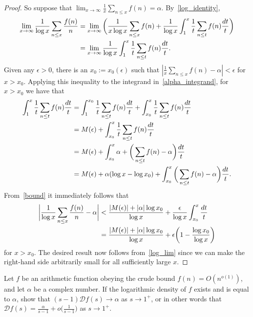 \documentclass[11pt]{article}
\newenvironment{ex}[1]
  {\renewcommand\theinnercustomthm{#1}\innercustomthm}
  {\endinnercustomthm}
\begin{document}
\begin{proof}
So suppose that $\lim_{x\to\infty}\frac{1}{x}\sum_{n\leq x}f(n) = \alpha$. By~\eqref{log_identity},
\begin{align}
\lim_{x\to\infty}\frac{1}{\log{x}}\sum_{n\leq x}\frac{f(n)}{n} &= \lim_{x\to\infty}\bigg(\frac{1}{x\log{x}}\sum_{n\leq x}f(n)+\frac{1}{\log{x}}\int_1^x\frac{1}{t}\sum_{n\leq t}f(n)\frac{dt}{t}\bigg)\notag\\
&= \lim_{x\to\infty}\frac{1}{\log{x}}\int_1^x\frac{1}{t}\sum_{n\leq t}f(n)\frac{dt}{t}.\label{alpha_integrand}
\end{align}
Given any $\epsilon >0$, there is an $x_0:=x_0(\epsilon)$ such that $|\frac{1}{x}\sum_{n\leq x}f(n)-\alpha|<\epsilon$ for $x>x_0$. Applying this inequality to the integrand in~\eqref{alpha_integrand}, for $x>x_0$ we have that
\begin{align}
\int_1^x\frac{1}{t}\sum_{n\leq t}f(n)\frac{dt}{t} &= \int_1^{x_0}\frac{1}{t}\sum_{n\leq t}f(n)\frac{dt}{t}+\int_{x_0}^x\frac{1}{t}\sum_{n\leq t}f(n)\frac{dt}{t}\notag\\
&= M(\epsilon)+\int_{x_0}^x\frac{1}{t}\sum_{n\leq t}f(n)\frac{dt}{t}\notag\\
&= M(\epsilon)+\int_{x_0}^x\alpha+\bigg(\sum_{n\leq t}f(n)-\alpha\bigg)\frac{dt}{t}\notag\\
&= M(\epsilon)+\alpha(\log{x}-\log{x_0})+\int_{x_0}^x\bigg(\sum_{n\leq t}f(n)-\alpha\bigg)\frac{dt}{t}.\label{bound}
\end{align}
From~\eqref{bound} it immediately follows that
\begin{align}
\bigg|\frac{1}{\log{x}}\sum_{n\leq x}\frac{f(n)}{n}-\alpha\bigg| &< \frac{|M(\epsilon)|+|\alpha|\log{x_0}}{\log{x}}+\frac{\epsilon}{\log{x}}\int_{x_0}^x\frac{dt}{t}\notag\\
&= \frac{|M(\epsilon)|+|\alpha|\log{x_0}}{\log{x}}+\epsilon\bigg(1-\frac{\log{x_0}}{\log{x}}\bigg)\label{log_lim}
\end{align}
for $x>x_0$. The desired result now follows from~\eqref{log_lim} since we can make the right-hand side arbitrarily small for all sufficiently large $x$.
\end{proof}

\begin{ex}{8}\label{eight}
Let $f$ be an arithmetic function obeying the crude bound $f(n) = O(n^{o(1)})$, and let $\alpha$ be a complex number. If the logarithmic density of $f$ exists and is equal to $\alpha$, show that $(s-1)\mathcal{D}f(s)\to\alpha$ as $s\to 1^+$, or in other words that $\mathcal{D}f(s)=\frac{\alpha}{s-1}+o\big(\frac{1}{s-1}\big)$ as $s\to 1^+$.
\end{ex}
\end{document}
